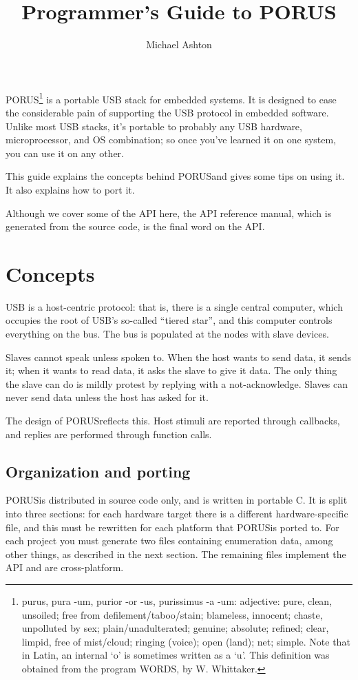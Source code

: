 \documentclass[10pt]{article}
\title{Programmer's Guide to PORUS}
\author{Michael Ashton}
\newcommand{\porus}{PORUS}
\begin{document}
\porus\footnote{purus, pura -um, purior -or -us, purissimus -a -um:  adjective: pure, clean, unsoiled; free from defilement/taboo/stain; blameless, innocent; chaste, unpolluted by sex; plain/unadulterated; genuine; absolute; refined; clear, limpid, free of mist/cloud; ringing (voice); open (land); net; simple.  Note that in Latin, an internal `o' is sometimes written as a `u'.  This definition was obtained from the program WORDS, by W. Whittaker.} is a portable USB stack for embedded systems.  It is designed to ease the considerable pain of supporting the USB protocol in embedded software.  Unlike most USB stacks, it's portable to probably any USB hardware, microprocessor, and OS combination; so once you've learned it on one system, you can use it on any other.

This guide explains the concepts behind \porus and gives some tips on using it.  It also explains how to port it.

Although we cover some of the API here, the API reference manual, which is generated from the source code, is the final word on the API.

\section{Concepts}

USB is a host-centric protocol: that is, there is a single central computer, which occupies the root of USB's so-called ``tiered star'', and this computer controls everything on the bus.  The bus is populated at the nodes with slave devices.

Slaves cannot speak unless spoken to.  When the host wants to send data, it sends it; when it wants to read data, it asks the slave to give it data.  The only thing the slave can do is mildly protest by replying with a not-acknowledge.  Slaves can never send data unless the host has asked for it.

The design of \porus reflects this.  Host stimuli are reported through callbacks, and replies are performed through function calls.

\subsection{Organization and porting}

\porus is distributed in source code only, and is written in portable C.  It is split into three sections: for each hardware target there is a different hardware-specific file, and this must be rewritten for each platform that \porus is ported to.  For each project you must generate two files containing enumeration data, among other things, as described in the next section.  The remaining files implement the API and are cross-platform.
\end{document}
